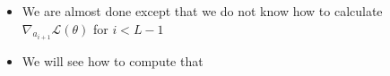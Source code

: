 \begin{frame}
\begin{columns}
\begin{overlayarea}{\textwidth}{\textheight}
      \begin{itemize}
        \justifying
        \item<12-> We are almost done except that we do not know how to calculate $\nabla_{a_{i+1}} \mathscr{L}(\theta)$ for $i < L-1$
        \item<13-> We will see how to compute that
      \end{itemize}
    \end{overlayarea}
    \begin{overlayarea}{\textwidth}{\textheight}
      \makebox[\textwidth][c]{\usebox{\nnhiddencompcontent}}
    \end{overlayarea}
  \end{columns}
\end{frame}


